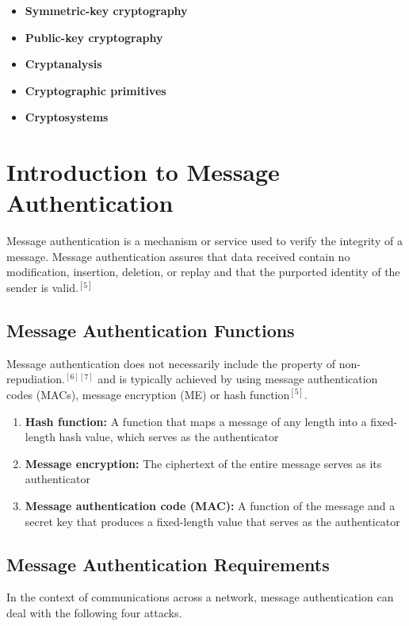 \documentclass[12pt,a4paper,oneside]{report}
\begin{document}
\begin{itemize}
    \item \textbf{Symmetric-key cryptography}
    \item \textbf{Public-key cryptography}
    \item \textbf{Cryptanalysis}
    \item \textbf{Cryptographic primitives}
    \item \textbf{Cryptosystems}
\end{itemize}

\section{Introduction to Message Authentication}
Message authentication is a mechanism or service used to verify the integrity of a message. Message authentication assures that data received contain no modification, insertion, deletion, or replay and that the purported identity of the sender is valid.$^{[5]}$ 



\subsection{Message Authentication Functions}
Message authentication does not necessarily include the property of non-repudiation.$^{[6][7]}$ and is typically achieved by using message authentication codes (MACs), message encryption (ME) or hash function$^{[5]}$.

\begin{enumerate}[(1)]
    \item \textbf{Hash function:} A function that maps a message of any length into a fixed-length
hash value, which serves as the authenticator
    \item \textbf{Message encryption:} The ciphertext of the entire message serves as its authenticator
    \item \textbf{Message authentication code (MAC):} A function of the message and a secret
key that produces a fixed-length value that serves as the authenticator
\end{enumerate}

\subsection{Message Authentication Requirements}
In the context of communications across a network, message authentication can deal with the following four attacks.
\end{document}
